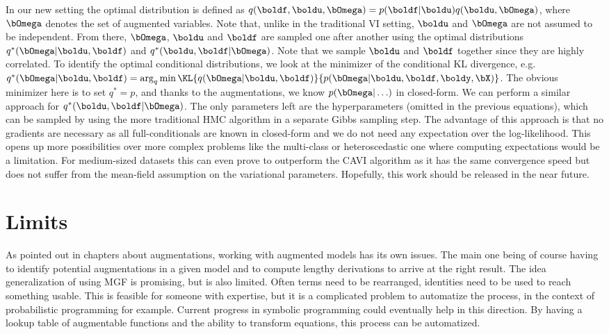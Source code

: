 In our new setting the optimal distribution is defined as $q(\boldf,\boldu,\bOmega) = p(\boldf|\boldu)q(\boldu, \bOmega)$, where $\bOmega$ denotes the set of augmented variables.
Note that, unlike in the traditional \ac{VI} setting, $\boldu$ and $\bOmega$ are not assumed to be independent.
From there, $\bOmega$, $\boldu$ and $\boldf$ are sampled one after another using the optimal distributions $q^*(\bOmega|\boldu,\boldf)$ and $q^*(\boldu,\boldf|\bOmega)$.
Note that we sample $\boldu$ and $\boldf$ together since they are highly correlated.
To identify the optimal conditional distributions, we look at the minimizer of the conditional \ac{KL} divergence, e.g. $q^*(\bOmega|\boldu,\boldf) = \arg_{q} \min \KL{q(\bOmega|\boldu,\boldf)}{p(\bOmega|\boldu,\boldf,\boldy,\bX)}$.
The obvious minimizer here is to set $q^*=p$, and thanks to the augmentations, we know $p(\bOmega|\ldots)$ in closed-form.
We can perform a similar approach for $q^*(\boldu,\boldf|\bOmega)$.
The only parameters left are the hyperparameters (omitted in the previous equations), which can be sampled by using the more traditional \ac{HMC} algorithm in a separate Gibbs sampling step.
The advantage of this approach is that no gradients are necessary as all full-conditionals are known in closed-form and we do not need any expectation over the log-likelihood.
This opens up more possibilities over more complex problems like the multi-class or heteroscedastic one where computing expectations would be a limitation.
For medium-sized datasets this can even prove to outperform the \ac{CAVI} algorithm as it has the same convergence speed but does not suffer from the mean-field assumption on the variational parameters.
Hopefully, this work should be released in the near future.

\section{Limits}

As pointed out in chapters about augmentations, working with augmented models has its own issues.
The main one being of course having to identify potential augmentations in a given model and to compute lengthy derivations to arrive at the right result.
The idea generalization of using \ac{MGF} is promising, but is also limited.
Often terms need to be rearranged, identities need to be used to reach something usable.
This is feasible for someone with expertise, but it is a complicated problem to automatize the process, in the context of probabilistic programming for example.
Current progress in symbolic programming could eventually help in this direction.
By having a lookup table of augmentable functions and the ability to transform equations, this process can be automatized.

